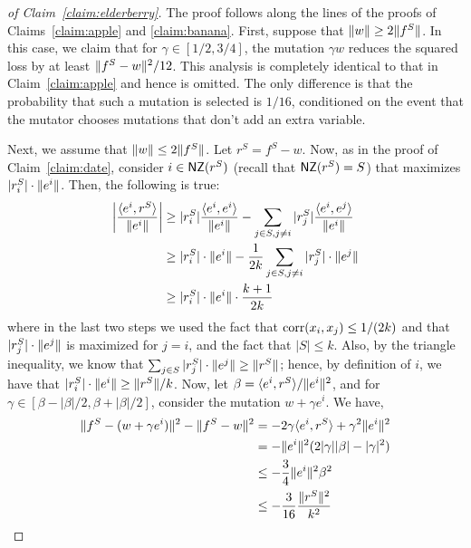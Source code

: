 \begin{proof}[of Claim~\ref{claim:elderberry}] 
The proof follows along the lines of the proofs of Claims~\ref{claim:apple} and
\ref{claim:banana}.  First, suppose that $\Vert w \Vert \geq 2 \Vert f^S \Vert$.
In this case, we claim that for $\gamma \in [1/2, 3/4]$, the mutation $\gamma w$
reduces the squared loss by at least $\Vert f^S - w \Vert^2/12$. This analysis is
completely identical to that in Claim~\ref{claim:apple} and hence is omitted.
The only difference is that the probability that such a mutation is selected is
$1/16$, conditioned on the event that the mutator chooses mutations that don't
add an extra variable.

Next, we assume that $\Vert w \Vert \leq 2 \Vert f^S \Vert$. Let $r^S = f^S - w$.
Now, as in the proof of Claim~\ref{claim:date}, consider $i \in \mathsf{NZ}(r^S)$ (recall
that $\mathsf{NZ}(r^S) = S$) that maximizes $|r^S_i| \cdot \Vert e^i \Vert$.
Then, the following is true:
\begin{align}
\left| \frac{\langle e^i, r^S \rangle}{\Vert e^i \Vert} \right| &\geq |r^S_i|
\frac{\langle e^i, e^i \rangle}{\Vert e^i \Vert} - \sum_{j \in S, j \neq i} |r^S_j|
\frac{\langle e^i, e^j \rangle}{\Vert e^i \Vert} \nonumber \\
&\geq |r^S_i| \cdot \Vert e^i \Vert - \frac{1}{2k} \sum_{j \in S, j \neq i}
|r^S_j| \cdot \Vert e^j \Vert \nonumber \\
&\geq |r^S_i| \cdot \Vert e^i \Vert \cdot \frac{k+1}{2k} \label{eqn:fennel}
\end{align}
%
where in the last two steps we used the fact that $\mathrm{corr}(x_i, x_j) \leq 1/(2k)$
and that $|r^S_j| \cdot \Vert e^j \Vert$ is maximized for $j = i$, and the fact
that $|S| \leq k$. Also, by the triangle inequality, we know that $\sum_{j \in
S} |r^S_j| \cdot \Vert e^j \Vert \geq \Vert r^S \Vert$; hence, by definition of
$i$, we have that $|r^S_i| \cdot \Vert e^i \Vert \geq \Vert r^S \Vert/k$. Now, let
$\beta = \langle e^i, r^S \rangle/\Vert e^i \Vert^2$, and for $\gamma \in [\beta -
|\beta|/2, \beta + |\beta|/2]$, consider the mutation $w + \gamma e^i$. We have,
\begin{align*}
\ltwonorm{f^S - (w + \gamma e^i)}^2 - \ltwonorm{f^S - w}^2 &= -2 \gamma
\ip{e^i}{r^S} + \gamma^2 \ltwonorm{e^i}^2 \\
&= - \ltwonorm{e^i}^2(2 |\gamma| |\beta| - |\gamma|^2) \\
&\leq - \frac{3}{4} \ltwonorm{e^i}^2 \beta^2 \\%
&\leq - \frac{3}{16} \frac{\ltwonorm{r^S}^2}{k^2} %
\end{align*}


\end{proof}
